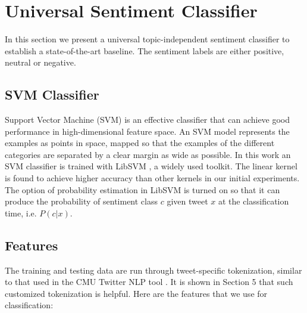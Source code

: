 \documentclass[11pt]{article}
\begin{document}
\section{Universal Sentiment Classifier}
In this section we present a universal topic-independent sentiment classifier to establish a state-of-the-art baseline.
The sentiment labels are either positive, neutral or negative.

\subsection{SVM Classifier}
Support Vector Machine (SVM) is an effective classifier that can achieve good performance in high-dimensional
feature space. An SVM model represents the examples as points in space, mapped so that the examples of the 
different categories are separated by a clear margin as wide as possible. In this work an SVM classifier is trained
with LibSVM \cite{LibSVM:11}, a widely used toolkit. The linear kernel is found to achieve higher accuracy than other
kernels in our initial experiments. The option of probability estimation in LibSVM is turned on so that it can produce the
probability of sentiment class $c$ given tweet $x$ at the classification time, i.e. $P(c|x)$.

\subsection{Features}
The training and testing data are run through tweet-specific tokenization, similar to that used in the CMU Twitter NLP
tool \cite{Gimpel:11}. It is shown in Section 5 that such customized tokenization is helpful.
Here are the features that we use for classification:
\end{document}
